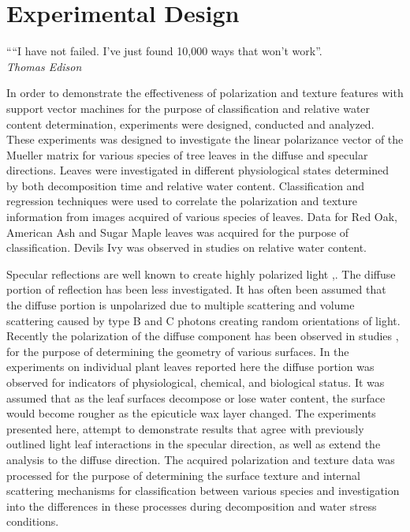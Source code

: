 \chapter{Experimental Design}
\begin{center}
  \begin{minipage}{0.75\textwidth}
    \begin{small}
      ““I have not failed. I've just found 10,000 ways that won't work”.\\
      \null\hfill\emph{Thomas Edison}
    \end{small}
  \end{minipage}
  \vspace{0.5cm}
\end{center}

In order to demonstrate the effectiveness of polarization and texture features with support vector machines for the purpose of classification and relative water content determination, experiments were designed, conducted and analyzed. These experiments was designed to investigate the linear polarizance vector of the Mueller matrix for various species of tree leaves in the diffuse and specular directions.  Leaves were investigated in different physiological states determined by both decomposition time and relative water content.  Classification and regression techniques were used to correlate the polarization and texture information from images acquired of various species of leaves.  Data for Red Oak, American Ash and Sugar Maple leaves was acquired for the purpose of classification.  Devils Ivy was observed in studies on relative water content.

Specular reflections are well known to create highly polarized light \cite{grant},\cite{vanderbilt}. The diffuse portion of reflection has been less investigated.  It has often been assumed that the diffuse portion is unpolarized due to multiple scattering and volume scattering caused by type B and C photons creating random orientations of light.  Recently the polarization of the diffuse component has been observed in studies \cite{surface}, \cite{shapediffuse} for the purpose of determining the geometry of various surfaces.  In the experiments on individual plant leaves reported here the diffuse portion was observed for indicators of physiological, chemical, and biological status. It was assumed that as the leaf surfaces decompose or lose water content, the surface would become rougher as the epicuticle wax layer changed. The experiments presented here, attempt to demonstrate results that agree with previously outlined light leaf interactions in the specular direction, as well as extend the analysis to the diffuse direction.  The acquired polarization and texture data was processed for the purpose of determining the surface texture and internal scattering mechanisms for classification between various species and investigation into the differences in these processes during decomposition and water stress conditions.

